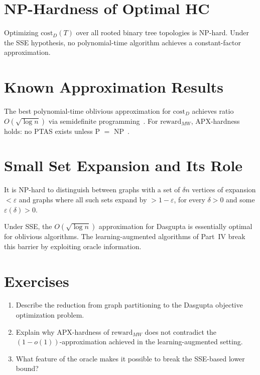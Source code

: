 \section{NP-Hardness of Optimal HC}

\begin{theorem}
Optimizing $\mathrm{cost}_D(T)$ over all rooted binary tree topologies is NP-hard. Under the SSE hypothesis, no polynomial-time algorithm achieves a constant-factor approximation.
\end{theorem}

\section{Known Approximation Results}

The best polynomial-time oblivious approximation for $\mathrm{cost}_D$ achieves ratio $O(\sqrt{\log n})$ via semidefinite programming~\cite{RoyPokutta2017}. For $\mathrm{reward}_{MW}$, APX-hardness holds: no PTAS exists unless P $=$ NP~\cite{CohenAddad2019}.

\section{Small Set Expansion and Its Role}

\begin{definition}
It is NP-hard to distinguish between graphs with a set of $\delta n$ vertices of expansion $< \varepsilon$ and graphs where all such sets expand by $> 1-\varepsilon$, for every $\delta > 0$ and some $\varepsilon(\delta) > 0$.
\end{definition}

Under SSE, the $O(\sqrt{\log n})$ approximation for Dasgupta is essentially optimal for oblivious algorithms. The learning-augmented algorithms of Part~IV break this barrier by exploiting oracle information.

\section{Exercises}

\begin{enumerate}
  \item Describe the reduction from graph partitioning to the Dasgupta objective optimization problem.
  \item Explain why APX-hardness of $\mathrm{reward}_{MW}$ does not contradict the $(1-o(1))$-approximation achieved in the learning-augmented setting.
  \item What feature of the oracle makes it possible to break the SSE-based lower bound?
\end{enumerate}
